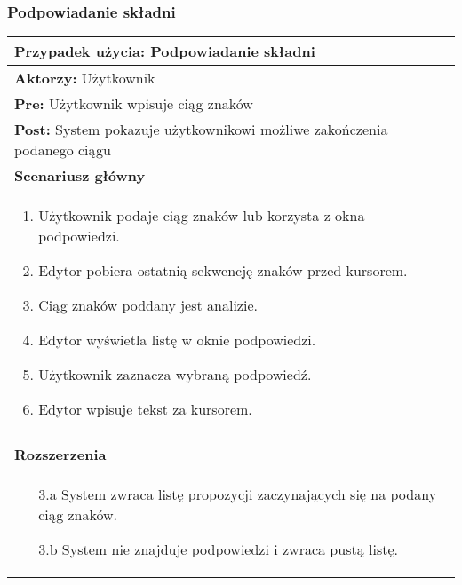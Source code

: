 \subsubsection{Podpowiadanie składni}
\label{reqAutocompletion}
\begin{table}[H]
\centering
\begin{tabular}{|p{\textwidth}|}
\hline 
\textbf{Przypadek użycia:} Podpowiadanie składni\\
\hline
\textbf{Aktorzy:} Użytkownik\\
\hline
\textbf{Pre:} Użytkownik wpisuje ciąg znaków\\
\hline
\textbf{Post:} System pokazuje użytkownikowi możliwe zakończenia podanego ciągu\\
\hline
\textbf{Scenariusz główny}\\
\hline
\begin{enumerate}
\item Użytkownik podaje ciąg znaków lub korzysta z okna podpowiedzi.
\item Edytor pobiera ostatnią sekwencję znaków przed kursorem.
\item Ciąg znaków poddany jest analizie.
\item Edytor wyświetla listę w oknie podpowiedzi.
\item Użytkownik zaznacza wybraną podpowiedź.
\item Edytor wpisuje tekst za kursorem.
\end{enumerate}\\
\hline
\\\textbf{Rozszerzenia}\\
\hline
\begin{enumerate}
\item[3.a] System zwraca listę propozycji zaczynających się na podany ciąg znaków.
\item[3.b] System nie znajduje podpowiedzi i zwraca pustą listę.
\end{enumerate}\\
\hline
\end{tabular}
\end{table}
